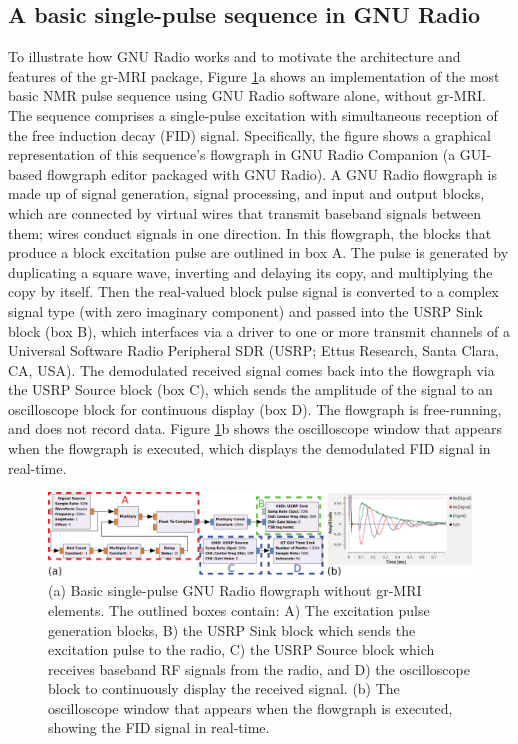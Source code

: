 \documentclass[review]{elsarticle}
\begin{document}
\subsection{A basic single-pulse sequence in GNU Radio}
To illustrate how GNU Radio works and to motivate the architecture and features of the
gr-MRI package, 
Figure \ref{fig:singlepulse}a shows an implementation of the most basic NMR pulse sequence using GNU Radio software alone, without gr-MRI. 
The sequence comprises a single-pulse excitation with simultaneous reception of the free induction decay (FID) signal. 
Specifically, 
the figure shows a graphical representation of this sequence's flowgraph in 
GNU Radio Companion (a GUI-based flowgraph editor packaged with GNU Radio).
A GNU Radio flowgraph is made up of signal generation, signal processing, and input and output blocks,
which are connected by virtual wires that transmit baseband signals between them; 
wires conduct signals in one direction. 
In this flowgraph, the blocks that produce a block excitation pulse are outlined in box A.  
The pulse is generated by duplicating a square wave, inverting and delaying its copy, and multiplying the copy by itself. 
Then the real-valued block pulse signal is converted to a complex signal type (with zero imaginary
component) and passed into the USRP Sink block 
(box B), which interfaces via a driver to one or more transmit 
channels of a Universal Software Radio Peripheral SDR (USRP; Ettus Research, Santa Clara, CA, USA). 
The demodulated received signal comes back into the flowgraph via the USRP Source block (box C), 
which sends the amplitude of the signal to an oscilloscope block
for continuous display (box D). 
The flowgraph is free-running, and does not record data.
Figure \ref{fig:singlepulse}b shows the oscilloscope window that appears when the flowgraph is executed, 
which displays the demodulated FID signal in real-time.

\begin{figure}[!ht]
\begin{center}
\includegraphics[width = \textwidth,trim=0 0 0 0,clip=false]{Fig1_fromChris/Fig1.eps}%
\caption{(a) Basic single-pulse GNU Radio flowgraph without gr-MRI elements.  
The outlined boxes contain: 
A) The excitation pulse generation blocks, 
B) the USRP Sink block which sends the excitation pulse to the radio, 
C) the USRP Source block which receives baseband RF signals from the radio, 
and D) the oscilloscope block to continuously display the received signal.
(b) The oscilloscope window that appears when the flowgraph is executed, showing the FID signal in real-time.}
\label{fig:singlepulse}
\end{center}
\end{figure}
\end{document}
